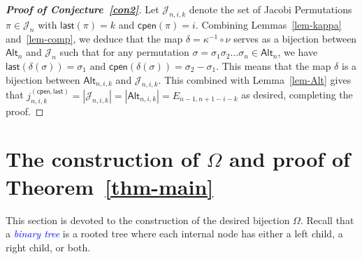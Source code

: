\documentclass[12pt]{article}
\def\blue{\textcolor{blue}}
\def\blue{\textcolor{blue}}
\numberwithin{equation}{section}
\def\blue{\textcolor{blue}}
\def\blue{\textcolor{blue}}
\theoremstyle{plain}
\def\Alt{\mathsf{Alt}}
\def\cpen{\mathsf{cpen}}
\def\last{\mathsf{last}}
\begin{document}
  \begin{proof}[{\bf Proof of Conjecture~\ref{con2}}]	Let $\mathcal{J}_{n,i,k}$ denote the set of Jacobi Permutations $\pi\in \mathcal{J}_n$ with $\last(\pi)=k$ and $\cpen(\pi)=i$. 
  Combining Lemmas~\ref{lem-kappa} and~\ref{lem-comp}, we deduce that
  the map $\delta=\kappa^{-1}\circ \nu$ serves as  a bijection between $\Alt_n$ and $\mathcal{J}_n$ such that for any  permutation $\sigma=\sigma_1\sigma_2\ldots \sigma_n\in \Alt_n$, we have
  $ 
  \last(\delta(\sigma))= \sigma_1 \,\, \mbox{and}\,\,  \cpen(\delta(\sigma))= \sigma_2-\sigma_1.
  $ 
  This means that the map $\delta$ is  a bijection between $\Alt_{n,i,k}$ and $\mathcal{J}_{n,i,k}$. This combined with Lemma~\ref{lem-Alt} gives that
  $j^{(\cpen, \last)}_{n,i,k}=|\mathcal{J}_{n,i,k}|=|\Alt_{n,i,k}|=E_{n-1, n+1-i-k}$ as desired, completing the proof. \end{proof}
  
  
  \section{The construction of $\Omega$ and proof of Theorem~\ref{thm-main}}
  
  \label{Sec:3}
  
  This section is devoted to the   construction of the desired  bijection $\Omega$. 
Recall that  a  \blue{\em binary tree} is a rooted tree where each internal node has either a left child, a right child, or both.   
 
 
\end{document}
